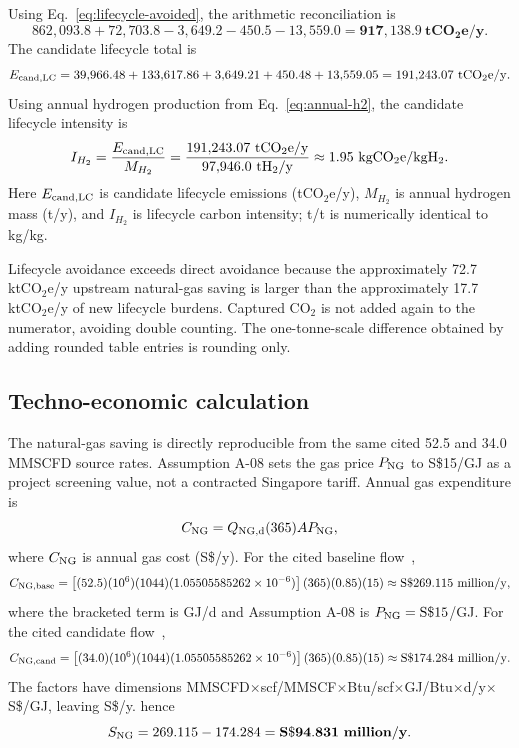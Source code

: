 Using Eq.~\ref{eq:lifecycle-avoided}, the arithmetic reconciliation is
\begin{equation}\label{eq:lifecycle-reconciliation}
862{,}093.8+72{,}703.8-3{,}649.2-450.5-13{,}559.0
=\mathbf{917{,}138.9~tCO_2e/y}.
\end{equation}
The candidate lifecycle total is
\begin{equation}\label{eq:candidate-lifecycle-total}
E_{\rm cand,LC}=39{,}966.48+133{,}617.86+3{,}649.21+450.48+13{,}559.05
=191{,}243.07~\mathrm{tCO_2e/y}.
\end{equation}
Using annual hydrogen production from Eq.~\ref{eq:annual-h2}, the candidate lifecycle intensity is
\begin{equation}\label{eq:lifecycle-intensity}
I_{H_2}=\frac{E_{\rm cand,LC}}{M_{H_2}}
=\frac{191{,}243.07~\mathrm{tCO_2e/y}}{97{,}946.0~\mathrm{tH_2/y}}
\approx1.95~\mathrm{kgCO_2e/kgH_2}.
\end{equation}
Here $E_{\rm cand,LC}$ is candidate lifecycle emissions (tCO$_2$e/y), $M_{H_2}$ is annual hydrogen mass (t/y), and $I_{H_2}$ is lifecycle carbon intensity; t/t is numerically identical to kg/kg.

Lifecycle avoidance exceeds direct avoidance because the approximately 72.7 ktCO$_2$e/y upstream natural-gas saving is larger than the approximately 17.7 ktCO$_2$e/y of new lifecycle burdens. Captured CO$_2$ is not added again to the numerator, avoiding double counting.  The one-tonne-scale difference obtained by adding rounded table entries is rounding only.

\subsection{Techno-economic calculation}
The natural-gas saving is directly reproducible from the same cited 52.5 and 34.0 MMSCFD source rates. Assumption A-08 sets the gas price $P_{\rm NG}$ to S\$15/GJ as a project screening value, not a contracted Singapore tariff. Annual gas expenditure is
\begin{equation}\label{eq:ng-cost-general}
C_{\rm NG}=Q_{\rm NG,d}(365)A P_{\rm NG},
\end{equation}
where $C_{\rm NG}$ is annual gas cost (S\$/y). For the cited baseline flow~\cite{inltev953},
\begin{equation}\label{eq:ng-cost-base}
C_{\rm NG,base}
=\left[(52.5)(10^6)(1044)(1.05505585262\times10^{-6})\right]
(365)(0.85)(15)
\approx\mathrm{S\$}269.115~\mathrm{million/y},
\end{equation}
where the bracketed term is GJ/d and Assumption A-08 is $P_{\rm NG}=\mathrm{S\$}15$/GJ. For the cited candidate flow~\cite{inltev961},
\begin{equation}\label{eq:ng-cost-candidate}
C_{\rm NG,cand}
=\left[(34.0)(10^6)(1044)(1.05505585262\times10^{-6})\right]
(365)(0.85)(15)
\approx\mathrm{S\$}174.284~\mathrm{million/y}.
\end{equation}
The factors have dimensions MMSCFD$\times$scf/MMSCF$\times$Btu/scf$\times$GJ/Btu$\times$d/y$\times$S\$/GJ, leaving S\$/y.
hence
\begin{equation}\label{eq:ng-saving}
S_{\rm NG}=269.115-174.284
=\mathbf{S\$94.831~million/y}.
\end{equation}

